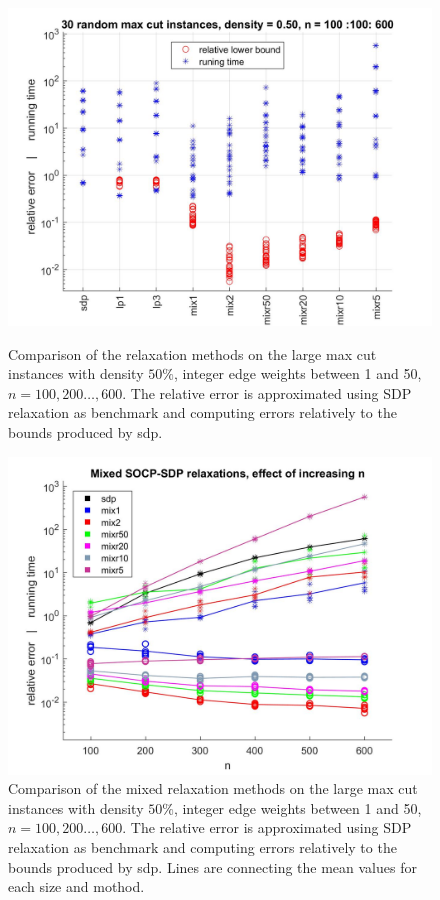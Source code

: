 \documentclass[12pt]{book}
\theoremstyle{definition}
\begin{document}
\begin{center}
\begin{figure}
\includegraphics[scale=0.27]{img/comp3.jpg}
\caption[Comparison of relaxations - large, dense instances of max cut 1]{Comparison of the relaxation methods on the large max cut instances with density  $50\%$, integer edge weights between 1 and 50, $n=100,200\dots ,600$. The relative error is approximated using SDP relaxation as benchmark and computing errors relatively to the bounds produced by sdp.} 
\label{comp3}

\includegraphics[scale=0.27]{img/comp_mix_n_100-600.jpg}
\caption[Comparison of relaxations - large, dense instances of max cut 2]{Comparison of the mixed relaxation methods on the large max cut instances with density  $50\%$, integer edge weights between 1 and 50, $n=100,200\dots ,600$. The relative error is approximated using SDP relaxation as benchmark and computing errors relatively to the bounds produced by sdp. Lines are connecting the mean values for each size and mothod.} 
\label{comp3size}
\end{figure}
\end{center}
\end{document}
